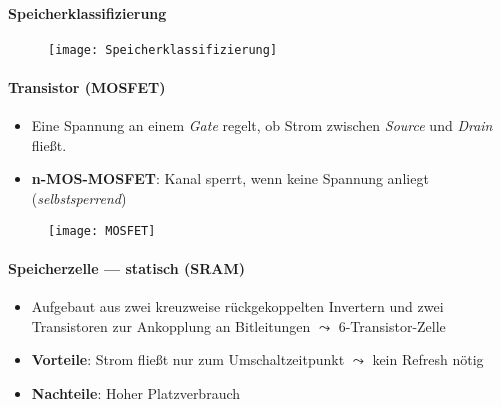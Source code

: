 \paragraph{Speicherklassifizierung}
\begin{figure}[H]\centering\label{Speicherklassifizierung}\texttt{[image: Speicherklassifizierung]}\end{figure}

\paragraph{Transistor (MOSFET)}
\begin{itemize}
	\item Eine Spannung an einem \emph{Gate} regelt, ob Strom zwischen \emph{Source} und \emph{Drain} fließt.
	\item \textbf{n-MOS-MOSFET}: Kanal sperrt, wenn keine Spannung anliegt (\emph{selbstsperrend})
\end{itemize}
\begin{figure}[H]\centering\label{MOSFET}\texttt{[image: MOSFET]}\end{figure}

\paragraph{Speicherzelle --- statisch (SRAM)}
\begin{itemize}
	\item Aufgebaut aus zwei kreuzweise rückgekoppelten Invertern und zwei Transistoren zur Ankopplung an Bitleitungen \( \leadsto \) 6-Transistor-Zelle
	\item \textbf{Vorteile}: Strom fließt nur zum Umschaltzeitpunkt \( \leadsto \) kein Refresh nötig
	\item \textbf{Nachteile}: Hoher Platzverbrauch
\end{itemize}

